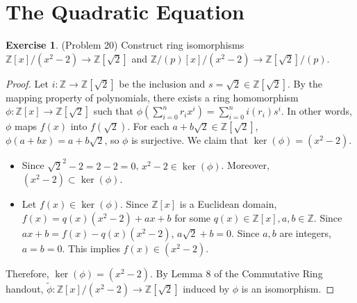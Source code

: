 \documentclass[12pt, psamsfonts]{amsart}
\theoremstyle{definition}
\newtheorem*{exer}{Exercise}
\theoremstyle{remark}
\numberwithin{equation}{section}
\begin{document}
\section{The Quadratic Equation}

\begin{exer}{(Problem 20)}
  Construct ring isomorphisms $\mathbb{Z}[x]/(x^2 - 2) \rightarrow \mathbb{Z}[\sqrt{2}]$ and $\mathbb{Z}/(p)[x]/(x^2 - 2) \rightarrow \mathbb{Z}[\sqrt{2}]/(p)$.
\end{exer}

\begin{proof}
  Let $i: \mathbb{Z} \rightarrow \mathbb{Z}[\sqrt{2}]$ be the inclusion and $s = \sqrt{2} \in \mathbb{Z}[\sqrt{2}]$.
  By the mapping property of polynomials, there exists a ring homomorphism $\phi: \mathbb{Z}[x] \rightarrow \mathbb{Z}[\sqrt{2}]$ such that $\phi(\sum_{i=0}^{n} r_ix^i) = \sum_{i=0}^{n} i(r_i)s^i$.
  In other words, $\phi$ maps $f(x)$ into $f(\sqrt{2})$.
  For each $a + b\sqrt{2} \in \mathbb{Z}[\sqrt{2}]$, $\phi(a + bx) = a + b\sqrt{2}$, so $\phi$ is surjective.
  We claim that $\ker(\phi) = (x^2 - 2)$.
  \begin{itemize}
    \item
      Since $\sqrt{2}^2 - 2 = 2 - 2 = 0$, $x^2 - 2 \in \ker(\phi)$.
      Moreover, $(x^2 - 2) \subset \ker(\phi)$.
    \item
      Let $f(x) \in \ker(\phi)$.
      Since $\mathbb{Z}[x]$ is a Euclidean domain, $f(x) = q(x)(x^2 - 2) + ax + b$ for some $q(x) \in \mathbb{Z}[x], a, b \in \mathbb{Z}$.
      Since $ax + b = f(x) - q(x)(x^2 - 2)$, $a\sqrt{2} + b = 0$.
      Since $a, b$ are integers, $a = b = 0$.
      This implies $f(x) \in (x^2 - 2)$.
  \end{itemize}
  Therefore, $\ker(\phi) = (x^2 - 2)$.
  By Lemma 8 of the Commutative Ring handout, $\tilde{\phi} : \mathbb{Z}[x]/(x^2 - 2) \rightarrow \mathbb{Z}[\sqrt{2}]$ induced by $\phi$ is an isomorphism.


\end{proof}
\end{document}
